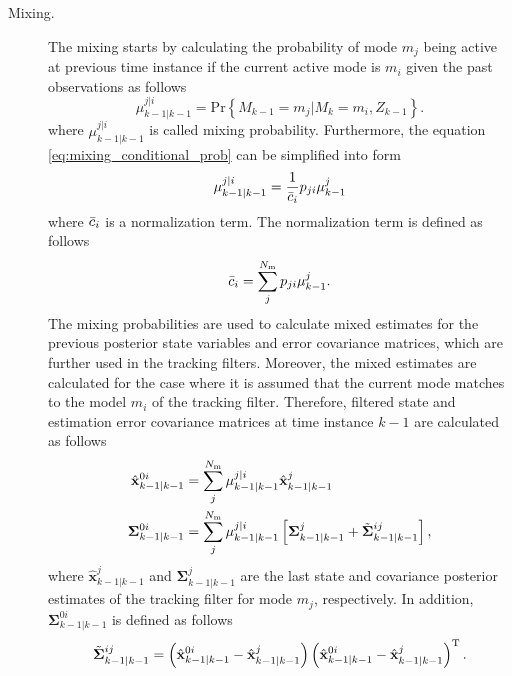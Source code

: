 \documentclass[english, 12pt, a4paper, elec, utf8, a-1b, online]{aaltothesis}
\renewcommand{\vec}[1]{\mathbf{#1}}
\renewcommand{\Pr}[1]{\text{Pr}\left\{ #1 \right\}}
\newcommand{\transpose}[1]{#1^\text{T}}
\newcommand{\lastmxprobs}{\mu^{j|i}_{k-1|k-1}}
\newcommand{\mxnorm}{ \Bar{c}_i }
\newcommand{\xmxinit}{\hat{\vec{x}}^{0i}_{k-1|k-1}}
\newcommand{\ecovmxinit}{\bm{\Sigma}^{0i}_{k-1|k-1}}
\newcommand{\modexlast}{\hat{\vec{x}}^{j}_{k-1|k-1}}
\newcommand{\modecovlast}{\bm{\Sigma}^j_{k-1|k-1}}
\newcommand{\modemxcovlast}{\Tilde{\bm{\Sigma}}^{ij}_{k-1|k-1}}
\newcommand{\nmodels}{{N_\text{m}}}
\begin{document}
\begin{description}
\item[Mixing.]

The mixing starts by calculating the probability of mode $m_j$ being active at previous time instance if the current active mode is $m_i$ given the past observations as follows
\begin{equation}\label{eq:mixing_conditional_prob}
    \lastmxprobs = \Pr{M_{k-1}=m_j|M_{k}=m_i, Z_{k-1}}.
\end{equation}
where $\lastmxprobs$ is called mixing probability.
Furthermore, the equation \eqref{eq:mixing_conditional_prob} can be simplified into form
\begin{equation}
    \lastmxprobs = \frac{1}{\mxnorm} p_{ji} \mu^j_{k-1} \label{eq:imm_mx_probs}
\end{equation}
where $\mxnorm$ is a normalization term. 
The normalization term is defined as follows
\begin{equation}
    \mxnorm = \sum_j^\nmodels p_{ji} \mu^j_{k-1}. \label{eq:imm_mx_normalization}
\end{equation}
The mixing probabilities are used to calculate mixed estimates for the previous posterior state variables and error covariance matrices, which are further used in the tracking filters.
Moreover, the mixed estimates are calculated for the case where it is assumed that the current mode matches to the model $m_i$ of the tracking filter.
Therefore, filtered state and estimation error covariance matrices at time instance $k-1$ are calculated as follows
\begin{subequations}
\begin{align}
    \xmxinit &= \sum_j^\nmodels \lastmxprobs \modexlast \label{eq:imm_mx_init_x}\\
    \ecovmxinit &= \sum_j^\nmodels \lastmxprobs \left[ \modecovlast + \modemxcovlast \right], \label{eq:imm_mx_init_P}
\end{align}
\end{subequations}
where $\modexlast$ and $\modecovlast$ are the last state and covariance posterior estimates of the tracking filter for mode $m_j$, respectively. 
In addition, $\ecovmxinit$ is defined as follows
\begin{equation}
    \modemxcovlast = 
    \left( \xmxinit - \modexlast  \right) 
    \transpose{\left( \xmxinit - \modexlast   \right)}.\label{eq:imm_mx_init_Ptilde}
\end{equation}


\end{description}
\end{document}
